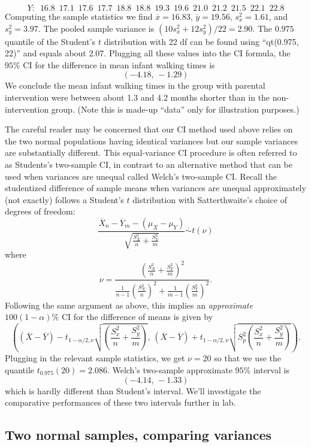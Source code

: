 \documentclass[
]{book}
\begin{document}
\[Y: \,\,\, 16.8\,\,\, 17.1\,\,\, 17.6\,\,\, 17.7\,\,\, 18.8\,\,\, 18.8\,\,\, 19.3\,\,\, 19.6\,\,\, 21.0\,\,\, 21.2\,\,\, 21.5\,\,\, 22.1\,\,\, 22.8\]
Computing the sample statistics we find \(\overline x = 16.83\), \(\overline y = 19.56\), \(s_x^2 = 1.61\), and \(s_y^2 = 3.97\). The pooled sample variance is \((10s_x^2+12s_y^2)/22 = 2.90\). The \(0.975\) quantile of the Student's \(t\) distribution with 22 df can be found using ``qt(0.975, 22)'' and equals about 2.07. Plugging all these values into the CI formula, the \(95\%\) CI for the difference in mean infant walking times is\\
\[(-4.18, \, -1.29)\]
We conclude the mean infant walking times in the group with parental intervention were between about 1.3 and 4.2 months shorter than in the non-intervention group. (Note this is made-up ``data'' only for illustration purposes.)

The careful reader may be concerned that our CI method used above relies on the two normal populations having identical variances but our sample variances are substantially different. This equal-variance CI procedure is often referred to as Students's two-sample CI, in contrast to an alternative method that can be used when variances are unequal called Welch's two-sample CI. Recall the studentized difference of sample means when variances are unequal approximately (not exactly) follows a Student's \(t\) distribution with Satterthwaite's choice of degrees of freedom:
\[\frac{\overline X_n - \overline Y_m - (\mu_X - \mu_Y)}{\sqrt{\frac{S_X^2}{n}+\frac{S_Y^2}{m}}}\stackrel{\cdot}{\sim}t(\nu)\]
where
\[\nu = \frac{\left(\frac{S_X^2}{n}+\frac{S_Y^2}{m}\right)^2}{\frac{1}{n-1}\left(\frac{S_X^2}{n}\right)^2 + \frac{1}{m-1}\left(\frac{S_Y^2}{m}\right)^2}.\]
Following the same argument as above, this implies an \emph{approximate} \(100(1-\alpha)\%\) CI for the difference of means is given by
\[\left((\overline X - \overline Y)-t_{1-\alpha/2, \nu}\sqrt{\left(\frac{S_x^2}{n} + \frac{S_y^2}{m}\right)}, \, (\overline X - \overline Y)+t_{1-\alpha/2, \nu}\sqrt{S_p^2\left(\frac{S_x^2}{n} + \frac{S_y^2}{m}\right)}\right).\]
Plugging in the relevant sample statistics, we get \(\nu = 20\) so that we use the quantile \(t_{0.975}(20) = 2.086\). Welch's two-sample approximate \(95\%\) interval is
\[(-4.14, \,-1.33)\]
which is hardly different than Student's interval. We'll investigate the comparative performances of these two intervals further in lab.

\hypertarget{two-normal-samples-comparing-variances}{%
\subsection{Two normal samples, comparing variances}\label{two-normal-samples-comparing-variances}}
\end{document}
